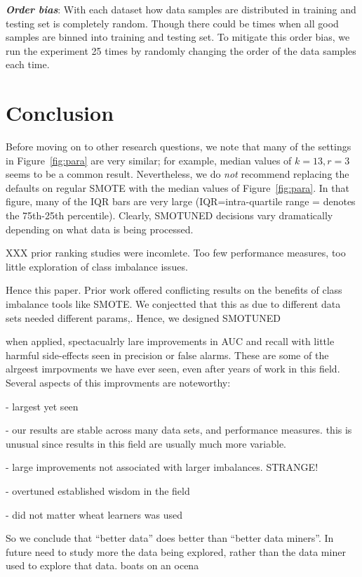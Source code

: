 \documentclass[10pt,conference]{IEEEtran}
\theoremstyle{break}
\theoremstyle{break}
\begin{document}
\textbf{\textit{Order bias}}: With each dataset how data samples are distributed in training and testing set is completely random. Though there could be times when all good samples are binned into training and testing set. To mitigate this order bias, we run
the experiment 25 times by randomly changing the order of the data samples each time.

\section{Conclusion}
\label{sect:conclusion}


Before moving on to other research questions, we note that many of the settings in Figure~\ref{fig:para} are very similar; for example, median values of $k=13,r=3$ seems to be a common
result.  Nevertheless, we do {\em not} recommend replacing
the defaults on regular SMOTE with the median values
of Figure~\ref{fig:para}. In that figure, many of the  IQR bars are
very large (IQR=intra-quartile range = denotes the
75th-25th percentile). Clearly, SMOTUNED  decisions vary dramatically
depending on what data  is being processed.  


XXX prior ranking studies were incomlete. Too few performance measures, too little exploration of class imbalance issues.

Hence this paper. Prior work offered conflicting results on the benefits of class imbalance tools like SMOTE. We conjectted that this  as due to different data sets needed different params,. Hence, we designed SMOTUNED

when applied, spectacualrly lare improvements in AUC and recall with
little harmful side-effects seen in precision or false alarms. These are some of the alrgeest imrpovments we have ever seen, even after years of work in this field. Several aspects of this improvments are noteworthy:

- largest yet seen

- our results are stable across many data sets, and performance measures. this is unusual since results in this field are usually much more variable.

- large improvements not associated with larger imbalances. STRANGE!

- overtuned established wisdom in the field

- did not matter wheat learners was used

So we conclude that ``better data'' does better than ``better data miners''. In future need to study more the data being explored, rather than the data miner used to explore that data. boats on an ocena
\end{document}

